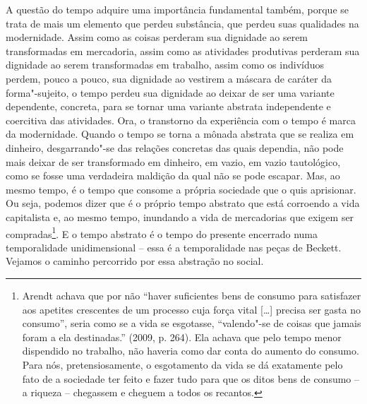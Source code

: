 A questão do tempo adquire uma importância fundamental também, porque se
trata de mais um elemento que perdeu substância, que perdeu suas
qualidades na modernidade. Assim como as coisas perderam sua dignidade
ao serem transformadas em mercadoria, assim como as atividades
produtivas perderam sua dignidade ao serem transformadas em trabalho,
assim como os indivíduos perdem, pouco a pouco, sua dignidade ao
vestirem a máscara de caráter da forma"-sujeito, o tempo perdeu sua
dignidade ao deixar de ser uma variante dependente, concreta, para se
tornar uma variante abstrata independente e coercitiva das atividades.
Ora, o transtorno da experiência com o tempo é marca da modernidade.
Quando o tempo se torna a mônada abstrata que se realiza em dinheiro,
desgarrando"-se das relações concretas das quais dependia, não pode mais
deixar de ser transformado em dinheiro, em vazio, em vazio tautológico,
como se fosse uma verdadeira maldição da qual não se pode escapar. Mas,
ao mesmo tempo, é o tempo que consome a própria sociedade que o quis
aprisionar. Ou seja, podemos dizer que é o próprio tempo abstrato que
está corroendo a vida capitalista e, ao mesmo tempo, inundando a vida de
mercadorias que exigem ser compradas\footnote{Arendt achava que por não
  ``haver suficientes bens de consumo para satisfazer aos apetites
  crescentes de um processo cuja força vital [\ldots{}] precisa ser gasta
  no consumo'', seria como se a vida se esgotasse, ``valendo"-se de
  coisas que jamais foram a ela destinadas.'' (2009, p. 264). Ela achava
  que pelo tempo menor dispendido no trabalho, não haveria como dar
  conta do aumento do consumo. Para nós, pretensiosamente, o esgotamento
  da vida se dá exatamente pelo fato de a sociedade ter feito e fazer
  tudo para que os ditos bens de consumo -- a riqueza -- chegassem e
  cheguem a todos os recantos.}. E o tempo abstrato é o tempo do
presente encerrado numa temporalidade unidimensional -- essa é a
temporalidade nas peças de Beckett. Vejamos o caminho percorrido por
essa abstração no social.

